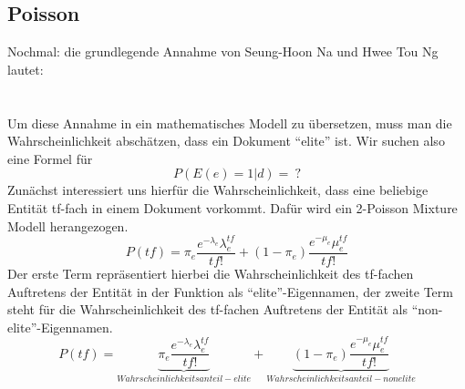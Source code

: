\subsection{Poisson}
Nochmal: die grundlegende Annahme von Seung-Hoon Na und Hwee Tou Ng lautet:\\
\\
\\
Um diese Annahme in ein mathematisches Modell zu übersetzen, muss man die Wahrscheinlichkeit abschätzen, dass ein Dokument ``elite'' ist. Wir suchen also eine Formel für
\[P\left( E\left( e \right)=1|d \right)=\ ?\]
Zunächst interessiert uns hierfür die Wahrscheinlichkeit, dass eine beliebige Entität tf-fach in einem Dokument vorkommt. Dafür wird ein 2-Poisson Mixture Modell herangezogen.
\[P\left( tf \right)=\pi_e\frac{e^{-\lambda_e}\lambda_{e}^{ tf }}{tf!}+\left( 1-\pi_e \right)\frac{e^{-\mu_e} \mu_e^{tf}}{tf!}\]
Der erste Term repräsentiert hierbei die Wahrscheinlichkeit des tf-fachen Auftretens der Entität in der Funktion als ``elite''-Eigennamen, der zweite Term steht für die Wahrscheinlichkeit des tf-fachen Auftretens der Entität als ``non-elite''-Eigennamen.
\[P\left( tf \right)=\underbrace{\pi_e\frac{e^{-\lambda_e}\lambda_{e}^{ tf }}{tf!}}_{Wahrscheinlichkeitsanteil - elite} +\underbrace{\left( 1-\pi_e \right)\frac{e^{-\mu_e} \mu_e^{tf}}{tf!}}_{Wahrscheinlichkeitsanteil - nonelite}\]
